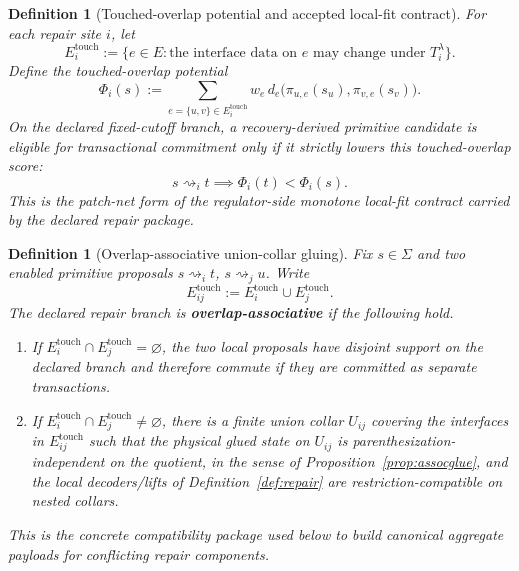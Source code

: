 \documentclass[11pt]{article}
\newtheorem{definition}[theorem]{Definition}
\theoremstyle{remark}
\theoremstyle{plain}
\begin{document}
\begin{definition}[Touched-overlap potential and accepted local-fit contract]\label{def:localfit}
For each repair site \(i\), let
\[
E_i^{\mathrm{touch}}
:=
\bigl\{
e\in E:\text{the interface data on }e\text{ may change under }T_i^\lambda
\bigr\}.
\]
Define the touched-overlap potential
\[
\Phi_i(s)
:=
\sum_{e=\{u,v\}\in E_i^{\mathrm{touch}}}
w_e\, d_e\!\bigl(\pi_{u,e}(s_u),\pi_{v,e}(s_v)\bigr).
\]
On the declared fixed-cutoff branch, a recovery-derived primitive candidate is eligible for
transactional commitment only if it strictly lowers this touched-overlap score:
\[
s\rightsquigarrow_i t \implies \Phi_i(t)<\Phi_i(s).
\]
This is the patch-net form of the regulator-side monotone local-fit contract carried by the
declared repair package.
\end{definition}

\begin{definition}[Overlap-associative union-collar gluing]\label{def:assoc}
Fix \(s\in\Sigma\) and two enabled primitive proposals \(s\rightsquigarrow_i t\),
\(s\rightsquigarrow_j u\). Write
\[
E_{ij}^{\mathrm{touch}}
:=
E_i^{\mathrm{touch}}\cup E_j^{\mathrm{touch}}.
\]
The declared repair branch is \textbf{overlap-associative} if the following hold.
\begin{enumerate}[label=(\roman*),leftmargin=2em]
\item If \(E_i^{\mathrm{touch}}\cap E_j^{\mathrm{touch}}=\varnothing\), the two local proposals
have disjoint support on the declared branch and therefore commute if they are committed as
separate transactions.
\item If \(E_i^{\mathrm{touch}}\cap E_j^{\mathrm{touch}}\neq\varnothing\), there is a finite union
collar \(U_{ij}\) covering the interfaces in \(E_{ij}^{\mathrm{touch}}\) such that the physical
glued state on \(U_{ij}\) is parenthesization-independent on the quotient, in the sense of
Proposition~\ref{prop:assocglue}, and the local decoders/lifts of
Definition~\ref{def:repair} are restriction-compatible on nested collars.
\end{enumerate}
This is the concrete compatibility package used below to build canonical aggregate payloads for
conflicting repair components.
\end{definition}
\end{document}
